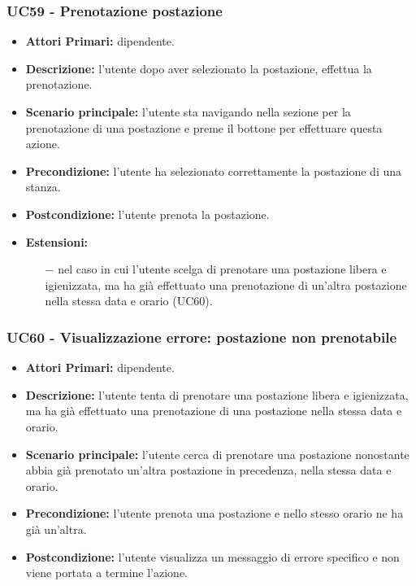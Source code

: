 \subsubsection{ UC59 - Prenotazione postazione }
\begin{itemize}
	\item\textbf{Attori Primari:} dipendente.
	\item\textbf{Descrizione:} l’utente dopo aver selezionato la postazione, effettua la prenotazione. 
	\item\textbf{Scenario principale:} l’utente sta navigando nella sezione per la prenotazione di una postazione
	e preme il bottone per effettuare questa azione.
	\item\textbf{Precondizione:} l’utente ha selezionato correttamente la postazione di una stanza.
	\item\textbf{Postcondizione:} l'utente prenota la postazione.
	\item\textbf{Estensioni:}
	\begin{itemize}
		\item[$-$] nel caso in cui l'utente scelga di prenotare una postazione libera e igienizzata, ma ha già effettuato una prenotazione di un'altra postazione nella stessa data e orario (UC60).
	\end{itemize}
\end{itemize}
\subsubsection{ UC60 - Visualizzazione errore: postazione non prenotabile }
\begin{itemize}
	\item\textbf{Attori Primari:} dipendente.
	\item\textbf{Descrizione:} l’utente tenta di prenotare una postazione libera e igienizzata, ma ha già effettuato una prenotazione di una postazione nella stessa data e orario.
	\item\textbf{Scenario principale:} l'utente cerca di prenotare una postazione nonostante abbia già prenotato un'altra postazione in precedenza, nella stessa data e orario.
	\item\textbf{Precondizione:} l'utente prenota una postazione e nello stesso orario ne ha già un'altra.
	\item\textbf{Postcondizione:} l’utente visualizza un messaggio di errore specifico e non viene portata a termine l’azione.
\end{itemize}

